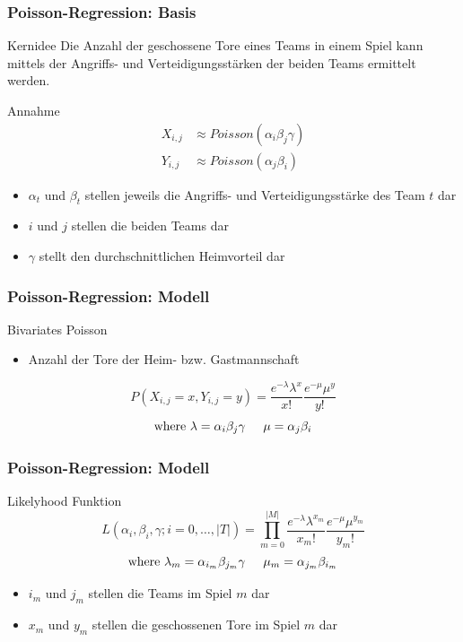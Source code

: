 \documentclass{beamer}
\begin{document}
    \begin{frame}
        \frametitle{Poisson-Regression: Basis}
        \begin{block}{Kernidee}
            Die Anzahl der geschossene Tore eines Teams in einem Spiel kann mittels der Angriffs- und Verteidigungsstärken der beiden Teams ermittelt werden.
        \end{block}
        \begin{block}{Annahme}
            \begin{align*}
                X_{i,j} &\approx Poisson(\alpha_i\beta_j\gamma)\\
                Y_{i,j} &\approx Poisson(\alpha_j\beta_i)
            \end{align*}
            \begin{itemize}
                \item $\alpha_t$ und $\beta_t$ stellen jeweils die Angriffs- und Verteidigungsstärke des Team $t$ dar
                \item $i$ und $j$ stellen die beiden Teams dar
                \item $\gamma$ stellt den durchschnittlichen Heimvorteil dar
            \end{itemize}
        \end{block}
    \end{frame}
    \begin{frame}
        \frametitle{Poisson-Regression: Modell}
        \begin{block}{Bivariates Poisson}
            \begin{itemize}
                \item Anzahl der Tore der Heim- bzw. Gastmannschaft
            \end{itemize}
            \[
                P(X_{i,j} = x, Y_{i,j} = y) =
                \frac{e^{-\lambda}\lambda^{x}}{x!}\frac{e^{-\mu}\mu^{y}}{y!}
            \]\[
                \text{where }
                \lambda = \alpha_{i}\beta_{j}\gamma \hspace{.5cm}
                \mu = \alpha_{j}\beta_{i}
            \]
        \end{block}
    \end{frame}
    \begin{frame}
        \frametitle{Poisson-Regression: Modell}
        \begin{block}{Likelyhood Funktion}
            \[
                L(\alpha_i, \beta_i, \gamma; i = 0,\hdots, |T|) =
                \prod_{m = 0}^{|M|} \frac{e^{-\lambda}\lambda^{x_m}}{x_m!}\frac{e^{-\mu}\mu^{y_m}}{y_m!}
            \]\[
                \text{where }
                \lambda_m = \alpha_{i_m}\beta_{j_m}\gamma \hspace{.5cm}
                \mu_m = \alpha_{j_m}\beta_{i_m}
            \]
            \begin{itemize}
                \item $i_m$ und $j_m$ stellen die Teams im Spiel $m$ dar
                \item $x_m$ und $y_m$ stellen die geschossenen Tore im Spiel $m$ dar
            \end{itemize}
        \end{block}
    \end{frame}
\end{document}
